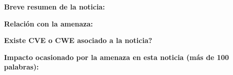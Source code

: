 \begin{tcolorbox}
    \textbf{Breve resumen de la noticia:}
    \vspace{0.5em}

    \textbf{Relación con la amenaza:}
    \vspace{0.5em}

    \textbf{\textquestiondown Existe CVE o CWE asociado a la noticia?}
    \vspace{0.5em}

    \textbf{Impacto ocasionado por la amenaza en esta noticia (más de 100 palabras):}
    \vspace{0.5em}

\end{tcolorbox}